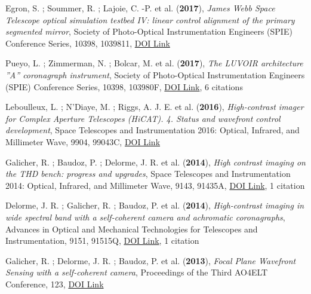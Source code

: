 \documentclass[11pt, a4paper, french]{article}
\begin{document}
\begin{etaremune}
 \item Egron, S. ; Soummer, R. ; Lajoie, C. -P. et al. ({\bf2017}), {\it James Webb Space Telescope optical simulation testbed IV: linear control alignment of the primary segmented mirror}, Society of Photo-Optical Instrumentation Engineers (SPIE) Conference Series, 10398, 1039811, \href{https://doi.org/10.1117/12.2272981}{DOI Link}

 \item Pueyo, L. ; Zimmerman, N. ; Bolcar, M. et al. ({\bf2017}), {\it The LUVOIR architecture ''A'' coronagraph instrument}, Society of Photo-Optical Instrumentation Engineers (SPIE) Conference Series, 10398, 103980F, \href{https://doi.org/10.1117/12.2274654}{DOI Link}, 6 citations

 \item Leboulleux, L. ; N'Diaye, M. ; Riggs, A. J. E. et al. ({\bf2016}), {\it High-contrast imager for Complex Aperture Telescopes (HiCAT). 4. Status and wavefront control development}, Space Telescopes and Instrumentation 2016: Optical, Infrared, and Millimeter Wave, 9904, 99043C, \href{https://doi.org/10.1117/12.2233640}{DOI Link}

 \item Galicher, R. ; Baudoz, P. ; Delorme, J. R. et al. ({\bf2014}), {\it High contrast imaging on the THD bench: progress and upgrades}, Space Telescopes and Instrumentation 2014: Optical, Infrared, and Millimeter Wave, 9143, 91435A, \href{https://doi.org/10.1117/12.2055902}{DOI Link}, 1 citation

 \item Delorme, J. R. ; Galicher, R. ; Baudoz, P. et al. ({\bf2014}), {\it High-contrast imaging in wide spectral band with a self-coherent camera and achromatic coronagraphs}, Advances in Optical and Mechanical Technologies for Telescopes and Instrumentation, 9151, 91515Q, \href{https://doi.org/10.1117/12.2056846}{DOI Link}, 1 citation

 \item Galicher, R. ; Delorme, J. R. ; Baudoz, P. et al. ({\bf2013}), {\it Focal Plane Wavefront Sensing with a self-coherent camera}, Proceedings of the Third AO4ELT Conference, 123, \href{https://doi.org/10.12839/AO4ELT3.18647}{DOI Link}

 \end{etaremune}
\end{document}
